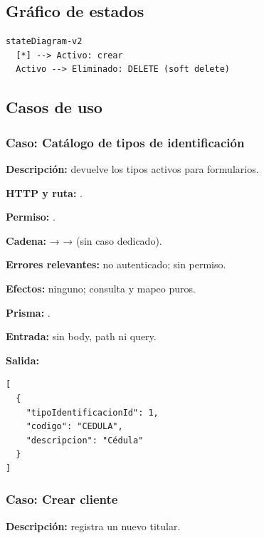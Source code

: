\subsection{Gráfico de estados}


\begin{lstlisting}
stateDiagram-v2
  [*] --> Activo: crear
  Activo --> Eliminado: DELETE (soft delete)
\end{lstlisting}


\subsection{Casos de uso}


\subsubsection{Caso: Catálogo de tipos de identificación}


\textbf{Descripción:} devuelve los tipos activos para formularios.


\textbf{HTTP y ruta:} \texttt{}.


\textbf{Permiso:} \texttt{}.


\textbf{Cadena:} \texttt{} → \texttt{} → \texttt{} (sin caso dedicado).


\textbf{Errores relevantes:} \texttt{} no autenticado; \texttt{} sin permiso.


\textbf{Efectos:} ninguno; consulta y mapeo puros.


\textbf{Prisma:} \texttt{}.


\textbf{Entrada:} sin body, path ni query.


\textbf{Salida:}


\begin{lstlisting}
[
  {
    "tipoIdentificacionId": 1,
    "codigo": "CEDULA",
    "descripcion": "Cédula"
  }
]
\end{lstlisting}


\subsubsection{Caso: Crear cliente}


\textbf{Descripción:} registra un nuevo titular.


